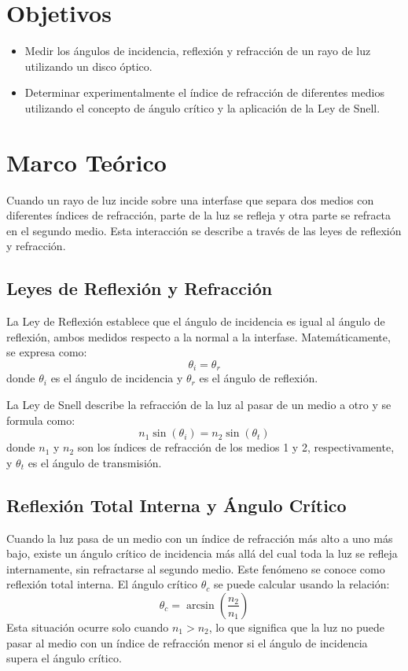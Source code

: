 \section{Objetivos}
\begin{itemize}
    \item Medir los ángulos de incidencia, reflexión y refracción de un rayo de luz utilizando un disco óptico.
    \item Determinar experimentalmente el índice de refracción de diferentes medios utilizando el concepto de ángulo crítico y la aplicación de la Ley de Snell.
\end{itemize}

\section{Marco Teórico}
Cuando un rayo de luz incide sobre una interfase que separa dos medios con diferentes índices de refracción, parte de la luz se refleja y otra parte se refracta en el segundo medio. Esta interacción se describe a través de las leyes de reflexión y refracción.

\subsection{Leyes de Reflexión y Refracción}
La Ley de Reflexión establece que el ángulo de incidencia es igual al ángulo de reflexión, ambos medidos respecto a la normal a la interfase. Matemáticamente, se expresa como:
\[
\theta_i = \theta_r
\]
donde $\theta_i$ es el ángulo de incidencia y $\theta_r$ es el ángulo de reflexión.

La Ley de Snell describe la refracción de la luz al pasar de un medio a otro y se formula como:
\[
n_1 \sin(\theta_i) = n_2 \sin(\theta_t)
\]
donde $n_1$ y $n_2$ son los índices de refracción de los medios 1 y 2, respectivamente, y $\theta_t$ es el ángulo de transmisión.

\subsection{Reflexión Total Interna y Ángulo Crítico}
Cuando la luz pasa de un medio con un índice de refracción más alto a uno más bajo, existe un ángulo crítico de incidencia más allá del cual toda la luz se refleja internamente, sin refractarse al segundo medio. Este fenómeno se conoce como reflexión total interna. El ángulo crítico $\theta_c$ se puede calcular usando la relación:
\[
\theta_c = \arcsin\left(\frac{n_2}{n_1}\right)
\]
Esta situación ocurre solo cuando $n_1 > n_2$, lo que significa que la luz no puede pasar al medio con un índice de refracción menor si el ángulo de incidencia supera el ángulo crítico.


